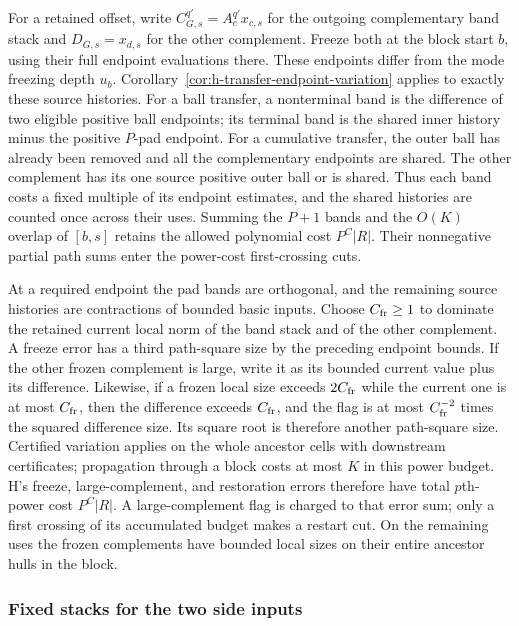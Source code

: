 For a retained offset, write
\(C_{G,s}^{q'}=A_c^{q'}x_{c,s}\) for the outgoing complementary
band stack and \(D_{G,s}=x_{d,s}\) for the other complement.
Freeze both at the block start \(b\), using their full endpoint
evaluations there.  These endpoints differ from the mode
freezing depth \(u_b\).  Corollary~\ref{cor:h-transfer-endpoint-variation}
applies to exactly these source histories.  For a ball transfer,
a nonterminal band is the difference of two eligible positive
ball endpoints; its terminal band is the shared inner history
minus the positive \(P\)-pad endpoint.  For a cumulative transfer,
the outer ball has already been removed and all the complementary
endpoints are shared.  The other complement has its one source
positive outer ball or is shared.  Thus each band costs a fixed
multiple of its endpoint estimates, and the shared histories
are counted once across their uses.  Summing the \(P+1\) bands
and the \(O(K)\) overlap of \([b,s]\) retains the allowed
polynomial cost \(P^C|R|\).
Their nonnegative partial path sums enter the power-cost first-crossing
cuts.

At a required endpoint the pad bands are orthogonal, and the
remaining source histories are contractions of bounded basic
inputs.  Choose \(C_{\rm fr}\ge1\) to dominate the retained
current local norm of the band stack and of the other complement.
A freeze error has a third path-square size by the preceding
endpoint bounds.  If the other frozen complement is large,
write it as its bounded current value plus its difference.
Likewise, if a frozen local size exceeds \(2C_{\rm fr}\) while
the current one is at most \(C_{\rm fr}\), then the difference
exceeds \(C_{\rm fr}\), and the flag is at most
\(C_{\rm fr}^{-2}\) times the squared difference size.  Its square root is therefore
another path-square size.  Certified variation applies on the whole ancestor cells with downstream
certificates; propagation through a block costs at most \(K\)
in this power budget.  H's freeze, large-complement, and
restoration errors therefore have total \(p\)th-power cost
\(P^C|R|\).  A large-complement flag is charged to that error
sum; only a first crossing of its accumulated budget makes a
restart cut.  On the remaining uses the frozen complements have
bounded local sizes on their entire ancestor hulls in the block.

\subsubsection{Fixed stacks for the two side inputs}

